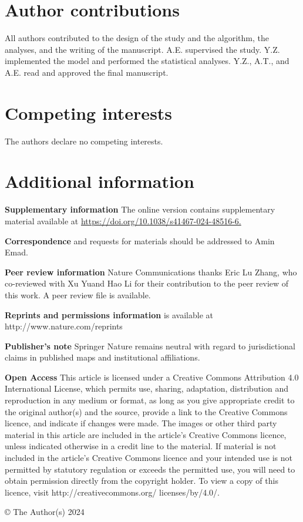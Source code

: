 \section*{Author contributions}

All authors contributed to the design of the study and the algorithm, the analyses, and the writing of the manuscript. A.E. supervised the study. Y.Z. implemented the model and performed the statistical analyses. Y.Z., A.T., and A.E. read and approved the final manuscript.

\section*{Competing interests}

The authors declare no competing interests.

\section*{Additional information}

\textbf{Supplementary information} The online version contains
supplementary material available at
\url{https://doi.org/10.1038/s41467-024-48516-6.}

\textbf{Correspondence} and requests for materials should be addressed to
Amin Emad.

\textbf{Peer review information} Nature Communications thanks Eric Lu Zhang,
who co-reviewed with Xu Yuand Hao Li for their contribution to the peer
review of this work. A peer review file is available.

\textbf{Reprints and permissions information} is available at
http://www.nature.com/reprints

\textbf{Publisher’s note} Springer Nature remains neutral with regard to
jurisdictional claims in published maps and institutional affiliations.

\textbf{Open Access} This article is licensed under a Creative Commons
Attribution 4.0 International License, which permits use, sharing,
adaptation, distribution and reproduction in any medium or format, as
long as you give appropriate credit to the original author(s) and the
source, provide a link to the Creative Commons licence, and indicate if
changes were made. The images or other third party material in this
article are included in the article’s Creative Commons licence, unless
indicated otherwise in a credit line to the material. If material is not
included in the article’s Creative Commons licence and your intended
use is not permitted by statutory regulation or exceeds the permitted
use, you will need to obtain permission directly from the copyright
holder. To view a copy of this licence, visit http://creativecommons.org/
licenses/by/4.0/.

© The Author(s) 2024